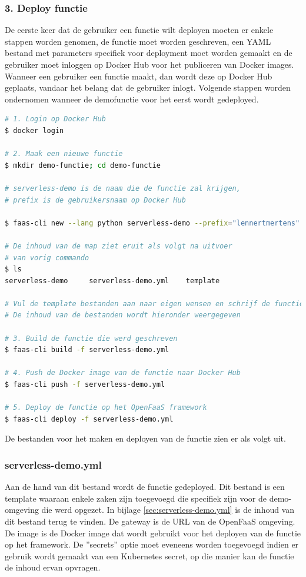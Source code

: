 \subsubsection{3. Deploy functie}
De eerste keer dat de gebruiker een functie wilt deployen moeten er enkele stappen worden genomen, de functie moet worden geschreven, een YAML bestand met parameters specifiek voor deployment moet worden gemaakt en de gebruiker moet inloggen op Docker Hub voor het publiceren van Docker images. Wanneer een gebruiker een functie maakt, dan wordt deze op Docker Hub geplaats, vandaar het belang dat de gebruiker inlogt. Volgende stappen worden ondernomen wanneer de demofunctie voor het eerst wordt gedeployed.

\begin{lstlisting}[language=bash]
# 1. Login op Docker Hub
$ docker login

# 2. Maak een nieuwe functie
$ mkdir demo-functie; cd demo-functie

# serverless-demo is de naam die de functie zal krijgen,
# prefix is de gebruikersnaam op Docker Hub

$ faas-cli new --lang python serverless-demo --prefix="lennertmertens"

# De inhoud van de map ziet eruit als volgt na uitvoer 
# van vorig commando
$ ls
serverless-demo     serverless-demo.yml    template

# Vul de template bestanden aan naar eigen wensen en schrijf de functie
# De inhoud van de bestanden wordt hieronder weergegeven

# 3. Build de functie die werd geschreven
$ faas-cli build -f serverless-demo.yml

# 4. Push de Docker image van de functie naar Docker Hub
$ faas-cli push -f serverless-demo.yml

# 5. Deploy de functie op het OpenFaaS framework
$ faas-cli deploy -f serverless-demo.yml
\end{lstlisting}

De bestanden voor het maken en deployen van de functie zien er als volgt uit.

\subsubsection{serverless-demo.yml}
Aan de hand van dit bestand wordt de functie gedeployed. Dit bestand is een template waaraan enkele zaken zijn toegevoegd die specifiek zijn voor de demo-omgeving die werd opgezet. In bijlage \ref{sec:serverless-demo.yml} is de inhoud van dit bestand terug te vinden. De gateway is de URL van de OpenFaaS omgeving. De image is de Docker image dat wordt gebruikt voor het deployen van de functie op het framework. De ''secrets'' optie moet eveneens worden toegevoegd indien er gebruik wordt gemaakt van een Kubernetes secret, op die manier kan de functie de inhoud ervan opvragen.

